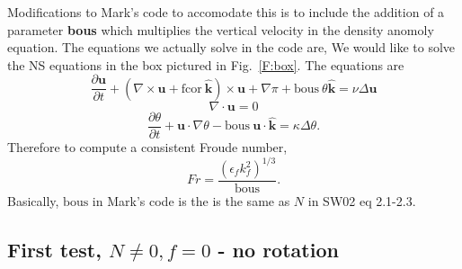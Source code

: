 \documentclass[12pt]{article}
\newcommand{\khat}{\hat{\mathbf k}}
\newcommand{\uv}{\mathbf u}
\newcommand{\grad}{\nabla}
\newcommand{\curl}{\grad \times}
\begin{document}
Modifications to Mark's code to accomodate this is to include the
addition of a parameter {\bf{bous}} which multiplies the vertical
velocity in the  density anomoly equation. The equations we actually
solve in the code are,
We would like to solve the NS equations in the box pictured in
Fig.~\ref{F:box}.  The equations are
\[ 
\frac{ \partial  \uv }{\partial t}  + (\curl \uv + \text{fcor} ~\khat) \times \uv
+  
\grad \pi + \text{bous}~ \theta \khat = \nu \Delta \uv 
\] 
\[ 
\grad \cdot \uv = 0 
\] 
\[ 
\frac{ \partial  \theta }{\partial t}  + \uv \cdot \grad \theta -  
\text{bous} ~\uv \cdot \khat = \kappa \Delta \theta.
\] 
Therefore to compute a consistent Froude number,
\begin{equation}
Fr = \frac{(\epsilon_f k_f^2)^{1/3}}{\text{bous}}.
\end{equation}
Basically, $\text{bous}$ in Mark's code is the is the same as $N$ in SW02 eq
2.1-2.3.

\subsection*{First test, $N\ne0, f=0$ - no rotation}
\end{document}
